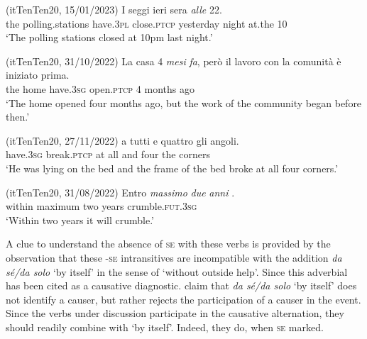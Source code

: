 \documentclass[output=paper,colorlinks,citecolor=brown
]{langscibook}
\begin{document}
\hspace*{\fill}(itTenTen20, 15/01/2023)\quad
\ea \label{bentley_example_29}
    \gll I			seggi													 				ieri 						sera 		\textit{alle}		22. \\
    the	polling.stations	have.3\textsc{pl}	close.\textsc{ptcp}		yesterday	night	at.the	10 \\
    \glt 	‘The polling stations closed at 10pm last night.’
\z

\hspace*{\fill}(itTenTen20, 31/10/2022)\quad
\ea \label{bentley_example_30}
    \gll La		casa													4	\textit{mesi}				\textit{fa}, {però il lavoro con la comunità è iniziato prima.}\\
    			the		home		have.3\textsc{sg}	open.\textsc{ptcp}	4	months	ago {} \\
    \glt 				‘The home opened four months ago, but the work of the community began before then.’
\z

\hspace*{\fill}(itTenTen20, 27/11/2022)\quad
\ea \label{bentley_example_31}
     												a		tutti	e				quattro 	gli 	angoli.  \\
    	{} 	have.3\textsc{sg}	break.\textsc{ptcp}	at	all		and	four				the	corners\\
    \glt 				‘He was lying on the bed and the frame of the bed broke at all four corners.’
\z

\hspace*{\fill}(itTenTen20, 31/08/2022)\quad
\ea \label{bentley_example_32}
    \gll Entro		\textit{massimo}			\textit{due}	\textit{anni}		. \\
    	within	maximum		two	years	crumble.\textsc{fut}.3\textsc{sg} \\
    \glt 				‘Within two years it will crumble.’
\z

A clue to understand the absence of \textsc{se} with these verbs is provided by the observation that these -\textsc{se} intransitives are incompatible with the addition \textit{da sé/da solo} ‘by itself’ in the sense of ‘without outside help’. Since \citet{chierchia1989semantics} this adverbial has been cited as a causative diagnostic. \citet[76—79]{alexiadou2015external}  claim that\textit{ da sé/da solo} ‘by itself’ does not identify a causer, but rather rejects the participation of a causer in the event. Since the verbs under discussion participate in the causative alternation, they should readily combine with ‘by itself’. Indeed, they do, when \textsc{se} marked.
\end{document}
